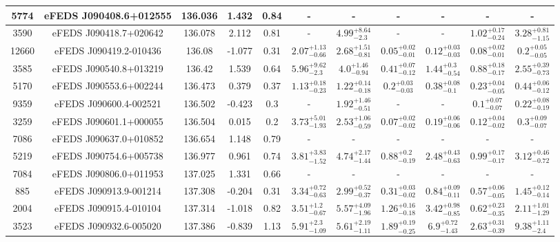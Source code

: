 \documentclass[fleqn,usenatbib]{mnras}
\begin{document}
\begin{table}
\begin{center}
\begin{tabular}{ccccccccccc}
\hline
5774 & eFEDS J090408.6+012555 & 136.036 & 1.432 & 0.84 & - & - & - & - & - & - \\ 
\hline
3590 & eFEDS J090418.7+020642 & 136.078 & 2.112 & 0.81 & - & $4.99^{+8.64}_{-2.3}$ & - & - & $1.02^{+0.17}_{-0.24}$ & $3.28^{+0.81}_{-1.15}$ \\ 
\hline
12660 & eFEDS J090419.2-010436 & 136.08 & -1.077 & 0.31 & $2.07^{+1.13}_{-0.66}$ & $2.68^{+1.51}_{-0.81}$ & $0.05^{+0.02}_{-0.01}$ & $0.12^{+0.03}_{-0.03}$ & $0.08^{+0.02}_{-0.01}$ & $0.2^{+0.05}_{-0.05}$ \\ 
\hline
3585 & eFEDS J090540.8+013219 & 136.42 & 1.539 & 0.64 & $5.96^{+9.62}_{-2.3}$ & $4.0^{+1.46}_{-0.94}$ & $0.41^{+0.07}_{-0.12}$ & $1.44^{+0.3}_{-0.54}$ & $0.88^{+0.18}_{-0.17}$ & $2.55^{+0.39}_{-0.73}$ \\ 
\hline
5170 & eFEDS J090553.6+002244 & 136.473 & 0.379 & 0.37 & $1.13^{+0.18}_{-0.23}$ & $1.22^{+0.14}_{-0.18}$ & $0.2^{+0.03}_{-0.03}$ & $0.38^{+0.08}_{-0.1}$ & $0.23^{+0.04}_{-0.05}$ & $0.44^{+0.06}_{-0.12}$ \\ 
\hline
9359 & eFEDS J090600.4-002521 & 136.502 & -0.423 & 0.3 & - & $1.92^{+1.46}_{-0.51}$ & - & - & $0.1^{+0.07}_{-0.07}$ & $0.22^{+0.08}_{-0.19}$ \\ 
\hline
3259 & eFEDS J090601.1+000055 & 136.504 & 0.015 & 0.2 & $3.73^{+5.01}_{-1.93}$ & $2.53^{+1.06}_{-0.59}$ & $0.07^{+0.02}_{-0.02}$ & $0.19^{+0.06}_{-0.06}$ & $0.12^{+0.04}_{-0.02}$ & $0.3^{+0.09}_{-0.07}$ \\ 
\hline
7086 & eFEDS J090637.0+010852 & 136.654 & 1.148 & 0.79 & - & - & - & - & - & - \\ 
\hline
5219 & eFEDS J090754.6+005738 & 136.977 & 0.961 & 0.74 & $3.81^{+3.83}_{-1.52}$ & $4.74^{+2.17}_{-1.44}$ & $0.88^{+0.2}_{-0.19}$ & $2.48^{+0.43}_{-0.63}$ & $0.99^{+0.17}_{-0.17}$ & $3.12^{+0.46}_{-0.72}$ \\ 
\hline
7084 & eFEDS J090806.0+011953 & 137.025 & 1.331 & 0.66 & - & - & - & - & - & - \\ 
\hline
885 & eFEDS J090913.9-001214 & 137.308 & -0.204 & 0.31 & $3.34^{+0.72}_{-0.63}$ & $2.99^{+0.52}_{-0.37}$ & $0.31^{+0.03}_{-0.02}$ & $0.84^{+0.09}_{-0.11}$ & $0.57^{+0.06}_{-0.05}$ & $1.45^{+0.12}_{-0.14}$ \\ 
\hline
2004 & eFEDS J090915.4-010104 & 137.314 & -1.018 & 0.82 & $3.51^{+1.2}_{-0.67}$ & $5.57^{+4.09}_{-1.96}$ & $1.26^{+0.16}_{-0.18}$ & $3.42^{+0.98}_{-0.85}$ & $0.62^{+0.23}_{-0.35}$ & $2.11^{+1.01}_{-1.29}$ \\ 
\hline
3523 & eFEDS J090932.6-005020 & 137.386 & -0.839 & 1.13 & $5.91^{+2.3}_{-1.09}$ & $5.61^{+2.19}_{-1.11}$ & $1.89^{+0.19}_{-0.25}$ & $6.9^{+0.72}_{-1.43}$ & $2.63^{+0.31}_{-0.39}$ & $9.38^{+1.11}_{-2.4}$ \\ 

\end{tabular}
\end{center}
\end{table}
\end{document}
